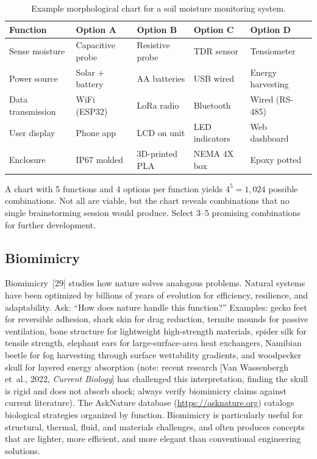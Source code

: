 \begin{table}[htbp]
\centering\small
\caption{Example morphological chart for a soil moisture monitoring system.}\label{tab:morph-chart}
\begin{tabularx}{\textwidth}{lXXXX}
\toprule
\textbf{Function} & \textbf{Option A} & \textbf{Option B} & \textbf{Option C} & \textbf{Option D} \\
\midrule
Sense moisture & Capacitive probe & Resistive probe & TDR sensor & Tensiometer \\
Power source & Solar + battery & AA batteries & USB wired & Energy harvesting \\
Data transmission & WiFi (ESP32) & LoRa radio & Bluetooth & Wired (RS-485) \\
User display & Phone app & LCD on unit & LED indicators & Web dashboard \\
Enclosure & IP67 molded & 3D-printed PLA & NEMA 4X box & Epoxy potted \\
\bottomrule
\end{tabularx}
\end{table}

A chart with 5 functions and 4 options per function yields $4^5 = 1{,}024$ possible combinations. Not all are viable, but the chart reveals combinations that no single brainstorming session would produce. Select 3--5 promising combinations for further development.

\subsection{Biomimicry}
Biomimicry~[29] studies how nature solves analogous problems. Natural systems have been optimized by billions of years of evolution for efficiency, resilience, and adaptability. Ask: ``How does nature handle this function?'' Examples: gecko feet for reversible adhesion, shark skin for drag reduction, termite mounds for passive ventilation, bone structure for lightweight high-strength materials, spider silk for tensile strength, elephant ears for large-surface-area heat exchangers, Namibian beetle for fog harvesting through surface wettability gradients, and woodpecker skull for layered energy absorption (note: recent research [Van Wassenbergh et~al., 2022, \emph{Current Biology}] has challenged this interpretation, finding the skull is rigid and does not absorb shock; always verify biomimicry claims against current literature). The AskNature database (\url{https://asknature.org}) catalogs biological strategies organized by function. Biomimicry is particularly useful for structural, thermal, fluid, and materials challenges, and often produces concepts that are lighter, more efficient, and more elegant than conventional engineering solutions.

